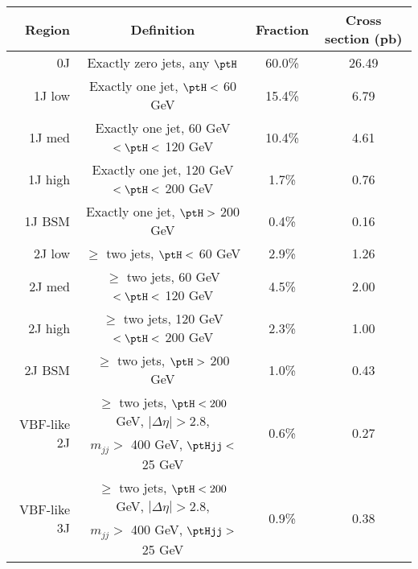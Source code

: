 \begin{tabular}{ r | c | c | c } 
\hline
Region & Definition & Fraction & Cross section (pb) \\ 
\hline
0J          & Exactly zero jets, any $\ptH$               & 60.0\% & 26.49 \\ 
\hline
1J low      & Exactly one jet, $\ptH <$ 60 GeV            & 15.4\% & 6.79  \\
\hline
1J med      & Exactly one jet, 60 GeV $< \ptH <$ 120 GeV  & 10.4\% & 4.61  \\ 
\hline
1J high     & Exactly one jet, 120 GeV $< \ptH <$ 200 GeV & 1.7\% & 0.76   \\
\hline
1J BSM      & Exactly one jet, $\ptH >$ 200 GeV           & 0.4\% & 0.16   \\ 
\hline
2J low      & $\ge$ two jets, $\ptH <$ 60 GeV             & 2.9\% & 1.26   \\
\hline
2J med      & $\ge$ two jets, 60 GeV $< \ptH <$ 120 GeV   & 4.5\% & 2.00   \\ 
\hline
2J high     & $\ge$ two jets, 120 GeV $< \ptH <$ 200 GeV  & 2.3\% & 1.00   \\
\hline
2J BSM      & $\ge$ two jets, $\ptH >$ 200 GeV            & 1.0\% & 0.43   \\ 
\hline
\multirow{2}{*}{VBF-like 2J} & $\ge$ two jets, $\ptH < 200$ GeV, $|\Delta\eta| > 2.8$, & \multirow{2}{*}{0.6\%} & \multirow{2}{*}{0.27} \\ 
                             & $m_{jj} >$ 400 GeV, $\ptHjj <$ 25 GeV &                        &                       \\ 
\hline
\multirow{2}{*}{VBF-like 3J} & $\ge$ two jets, $\ptH < 200$ GeV, $|\Delta\eta| > 2.8$, & \multirow{2}{*}{0.9\%} & \multirow{2}{*}{0.38} \\ 
                             & $m_{jj} >$ 400 GeV, $\ptHjj >$ 25 GeV &                        &                       \\ 
\hline
\end{tabular}
